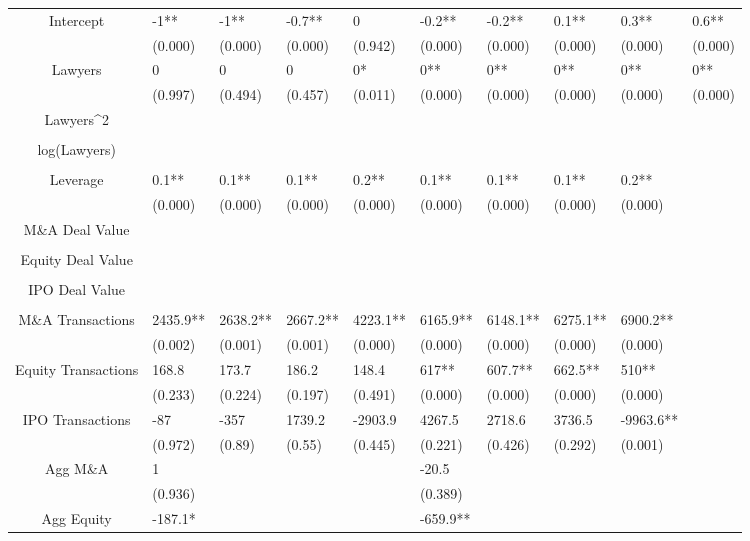 \documentclass{article}
\begin{document}
\begin{table}[H]
\begin{tabular}{|clllllllll|}
Intercept & -1** & -1** & -0.7** & 0 & -0.2** & -0.2** & 0.1** & 0.3** & 0.6** \\
   & (0.000) & (0.000) & (0.000) & (0.942) & (0.000) & (0.000) & (0.000) & (0.000) & (0.000) \\
  Lawyers & 0 & 0 & 0 & 0* & 0** & 0** & 0** & 0** & 0** \\
   & (0.997) & (0.494) & (0.457) & (0.011) & (0.000) & (0.000) & (0.000) & (0.000) & (0.000) \\
  Lawyers^2 &  &  &  &  &  &  &  &  &  \\
   &  &  &  &  &  &  &  &  &  \\
  log(Lawyers) &  &  &  &  &  &  &  &  &  \\
   &  &  &  &  &  &  &  &  &  \\
  Leverage & 0.1** & 0.1** & 0.1** & 0.2** & 0.1** & 0.1** & 0.1** & 0.2** &  \\
   & (0.000) & (0.000) & (0.000) & (0.000) & (0.000) & (0.000) & (0.000) & (0.000) &  \\
  M\&A Deal Value &  &  &  &  &  &  &  &  &  \\
   &  &  &  &  &  &  &  &  &  \\
  Equity Deal Value &  &  &  &  &  &  &  &  &  \\
   &  &  &  &  &  &  &  &  &  \\
  IPO Deal Value &  &  &  &  &  &  &  &  &  \\
   &  &  &  &  &  &  &  &  &  \\
  M\&A Transactions & 2435.9** & 2638.2** & 2667.2** & 4223.1** & 6165.9** & 6148.1** & 6275.1** & 6900.2** &  \\
   & (0.002) & (0.001) & (0.001) & (0.000) & (0.000) & (0.000) & (0.000) & (0.000) &  \\
  Equity Transactions & 168.8 & 173.7 & 186.2 & 148.4 & 617** & 607.7** & 662.5** & 510** &  \\
   & (0.233) & (0.224) & (0.197) & (0.491) & (0.000) & (0.000) & (0.000) & (0.000) &  \\
  IPO Transactions & -87 & -357 & 1739.2 & -2903.9 & 4267.5 & 2718.6 & 3736.5 & -9963.6** &  \\
   & (0.972) & (0.89) & (0.55) & (0.445) & (0.221) & (0.426) & (0.292) & (0.001) &  \\
  Agg M\&A & 1 &  &  &  & -20.5 &  &  &  &  \\
   & (0.936) &  &  &  & (0.389) &  &  &  &  \\
  Agg Equity & -187.1* &  &  &  & -659.9** &  &  &  &  \\

\end{tabular}
\end{table}
\end{document}
